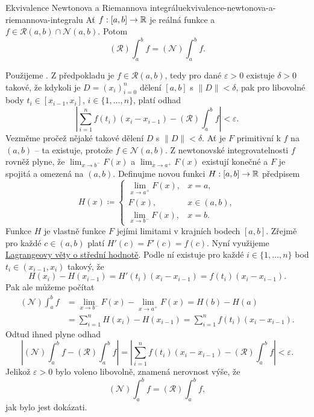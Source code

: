 \begin{theorem}{Ekvivalence Newtonova a Riemannova integrálu}{ekvivalence-newtonova-a-riemannova-integralu}
 Ať $f:[a,b] \to \mathbb{R}$ je reálná funkce a $f \in \mathcal{R}(a,b) \cap
 \mathcal{N}(a,b)$. Potom
 \[
  (\mathcal{R}) \int_{a}^{b} f = (\mathcal{N})\int_{a}^{b} f.
 \]
\end{theorem}
\begin{thmproof}
 Použijeme . Z předpokladu je
 $f \in \mathcal{R}(a,b)$, tedy pro dané $\varepsilon>0$ existuje $\delta>0$
 takové, že kdykoli je $D = (x_i)_{i=0}^{n}$ dělení $[a,b]$ s $\|D\|<\delta$,
 pak pro libovolné body $t_i \in [x_{i-1},x_i]$, $i \in \{1,\ldots,n\}$, platí
 odhad
 \[
  \left| \sum_{i = 1}^{n} f(t_i)(x_i - x_{i-1}) - (\mathcal{R})\int_{a}^{b} f
  \right| < \varepsilon.
 \]
 Vezměme pročež nějaké takové dělení $D$ s $\|D\|<\delta$. Ať je $F$ primitivní
 k $f$ na $(a,b)$ -- ta existuje, protože $f \in \mathcal{N}(a,b)$. Z
 newtonovské integrovatelnosti $f$ rovněž plyne, že $\lim_{x \to b^{-}} F(x)$ a
 $\lim_{x \to a^{+}} F(x)$ existují konečné a $F$ je spojitá a omezená na
 $(a,b)$. Definujme novou funkci $H:[a,b] \to \mathbb{R}$ předpisem
 \[
  H(x) \coloneqq \begin{cases}
   \lim_{x \to a^{+}} F(x),& x = a,\\
   F(x), & x \in (a,b),\\
   \lim_{x \to b^{-}} F(x), & x = b.
  \end{cases}
 \]
 Funkce $H$ je vlastně  funkce $F$ jejími limitami v krajních
 bodech $[a,b]$. Zřejmě pro každé $c \in (a,b)$ platí $H'(c) = F'(c) = f(c)$.
 Nyní využijeme \hyperref[thm:lagrangeova-o-stredni-hodnote]{Lagrangeovy věty o
 střední hodnotě}. Podle ní existuje pro každé $i \in \{1,\ldots,n\}$ bod
 $t_i \in (x_{i-1},x_i)$ takový, že
 \[
  H(x_i) - H(x_{i-1}) = H'(t_i)(x_i - x_{i-1}) = f(t_i)(x_i - x_{i-1}).
 \]
 Pak ale můžeme počítat
 \begin{align*}
  (\mathcal{N})\int_{a}^{b} f 
  &= \lim_{x \to b^{-}} F(x) - \lim_{x \to a^{+}} F(x) = H(b) - H(a)\\
  &= \sum_{i = 1}^{n} H(x_i) - H(x_{i-1}) = \sum_{i = 1}^{n} f(t_i)(x_i -
  x_{i-1}).
 \end{align*}
 Odtud ihned plyne odhad
 \[
  \left| (\mathcal{N})\int_{a}^{b} f - (\mathcal{R})\int_{a}^{b} f\right| =
  \left| \sum_{i = 1}^{n} f(t_i)(x_i - x_{i-1}) - (\mathcal{R}) \int_{a}^{b} f
  \right| < \varepsilon.
 \]
 Jelikož $\varepsilon>0$ bylo voleno libovolně, znamená nerovnost výše, že
 \[
  (\mathcal{N}) \int_{a}^{b} f = (\mathcal{R}) \int_{a}^{b} f,
 \]
 jak bylo jest dokázati.
\end{thmproof}
